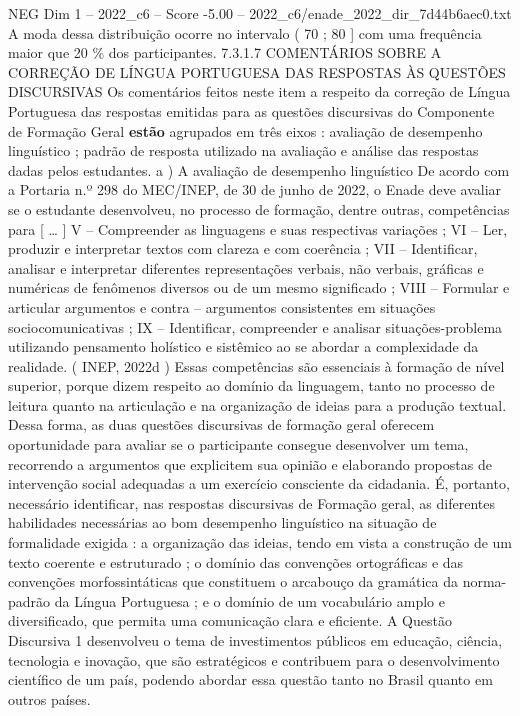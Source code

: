 \begin{textsample}{NEG Dim 1 – 2022\_c6 – Score -5.00 – 2022\_c6/enade\_2022\_dir\_7d44b6aec0.txt}
A moda dessa distribuição ocorre no intervalo ( 70 ; 80 ] com uma frequência maior que 20 \% dos participantes. 7.3.1.7 COMENTÁRIOS SOBRE A CORREÇÃO DE LÍNGUA PORTUGUESA DAS RESPOSTAS ÀS QUESTÕES DISCURSIVAS Os comentários feitos neste item a respeito da correção de Língua Portuguesa das respostas emitidas para as questões discursivas do Componente de Formação Geral \textbf{estão} agrupados em três eixos : avaliação de desempenho linguístico ; padrão de resposta utilizado na avaliação e análise das respostas dadas pelos estudantes. a ) A avaliação de desempenho linguístico De acordo com a Portaria n.º 298 do MEC/INEP, de 30 de junho de 2022, o Enade deve avaliar se o estudante desenvolveu, no processo de formação, dentre outras, competências para [ … ] V – Compreender as linguagens e suas respectivas variações ; VI – Ler, produzir e interpretar textos com clareza e com coerência ; VII – Identificar, analisar e interpretar diferentes representações verbais, não verbais, gráficas e numéricas de fenômenos diversos ou de um mesmo significado ; VIII – Formular e articular argumentos e contra – argumentos consistentes em situações sociocomunicativas ; IX – Identificar, compreender e analisar situações-problema utilizando pensamento holístico e sistêmico ao se abordar a complexidade da realidade. ( INEP, 2022d ) Essas competências são essenciais à formação de nível superior, porque dizem respeito ao domínio da linguagem, tanto no processo de leitura quanto na articulação e na organização de ideias para a produção textual.
Dessa forma, as duas questões discursivas de formação geral oferecem oportunidade para avaliar se o participante consegue desenvolver um tema, recorrendo a argumentos que explicitem sua opinião e elaborando propostas de intervenção social adequadas a um exercício consciente da cidadania.
É, portanto, necessário identificar, nas respostas discursivas de Formação geral, as diferentes habilidades necessárias ao bom desempenho linguístico na situação de formalidade exigida : a organização das ideias, tendo em vista a construção de um texto coerente e estruturado ; o domínio das convenções ortográficas e das convenções morfossintáticas que constituem o arcabouço da gramática da norma-padrão da Língua Portuguesa ; e o domínio de um vocabulário amplo e diversificado, que permita uma comunicação clara e eficiente.
A Questão Discursiva 1 desenvolveu o tema de investimentos públicos em educação, ciência, tecnologia e inovação, que são estratégicos e contribuem para o desenvolvimento científico de um país, podendo abordar essa questão tanto no Brasil quanto em outros países.

\end{textsample}

